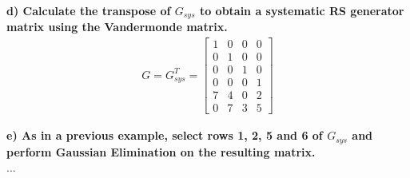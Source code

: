 \noindent\textbf{d) Calculate the transpose of $G_{sys}$ to obtain a systematic RS generator matrix using the Vandermonde matrix.}\\
\begin{align}
    G = G_{sys}^T = 
    \begin{bmatrix}
        1 & 0 & 0 & 0 \\
        0 & 1 & 0 & 0 \\
        0 & 0 & 1 & 0 \\
        0 & 0 & 0 & 1 \\
        7 & 4 & 0 & 2 \\
        0 & 7 & 3 & 5
    \end{bmatrix}
\end{align}

\noindent\textbf{e) As in a previous example, select rows 1, 2, 5 and 6 of $G_{sys}$ and perform Gaussian Elimination on the resulting matrix.}\\
...

\pagebreak